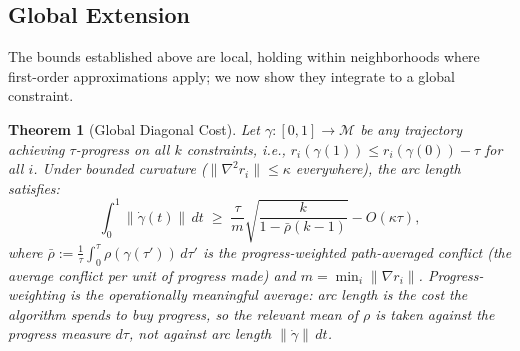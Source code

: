 \documentclass{article}
\theoremstyle{plain}
\newtheorem{theorem}{Theorem}[section]
\theoremstyle{definition}
\theoremstyle{remark}
\begin{document}
\subsection{Global Extension}\label{app:outlook}

The bounds established above are local, holding within neighborhoods where first-order approximations apply; we now show they integrate to a global constraint.

\begin{theorem}[Global Diagonal Cost]\label{thm:global}
Let $\gamma: [0,1] \to \mathcal{M}$ be any trajectory achieving $\tau$-progress on all $k$ constraints, i.e., $r_i(\gamma(1)) \le r_i(\gamma(0)) - \tau$ for all $i$. Under bounded curvature ($\|\nabla^2 r_i\| \le \kappa$ everywhere), the arc length satisfies:
\[
\int_0^1 \|\dot{\gamma}(t)\|\, dt \;\ge\; \frac{\tau}{m}\sqrt{\frac{k}{1-\bar{\rho}(k-1)}} - O(\kappa \tau),
\]
where $\bar{\rho} := \frac{1}{\tau}\int_0^\tau \rho(\gamma(\tau'))\, d\tau'$ is the \emph{progress-weighted} path-averaged conflict (the average conflict per unit of progress made) and $m = \min_i \|\nabla r_i\|$. Progress-weighting is the operationally meaningful average: arc length is the cost the algorithm spends to buy progress, so the relevant mean of $\rho$ is taken against the progress measure $d\tau$, not against arc length $\|\dot\gamma\|\,dt$.
\end{theorem}
\end{document}

